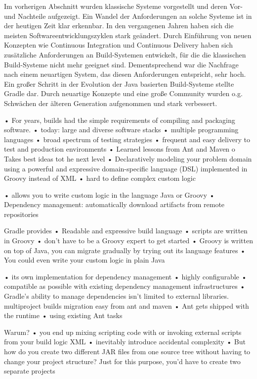 Im vorherigen Abschnitt wurden klassische Systeme vorgestellt und deren Vor- und Nachteile aufgezeigt.  Ein Wandel der Anforderungen an solche Systeme ist in der heutigen Zeit klar erkennbar.
In den vergangenen Jahren haben sich die meisten Softwareentwicklungszyklen stark geändert. Durch Einführung von neuen Konzepten wie Continuous Integration und Continuous Delivery haben sich zusätzliche Anforderungen an Build-Systemen entwickelt, für die die klassischen Build-Systeme nicht mehr geeignet sind. Dementsprechend war die Nachfrage nach einem neuartigen System, das diesen Anforderungen entspricht, sehr hoch. Ein großer Schritt in der Evolution der Java basierten Build-Systeme stellte Gradle dar. Durch neuartige Konzepte und eine große Community wurden o.g. Schwächen der älteren Generation aufgenommen und stark verbessert.



•	For years, builds had the simple requirements of compiling and packaging software.
•	today: large and diverse software stacks
•	multiple programming languages
•	broad spectrum of testing strategies
•	frequent and easy delivery to test and production environments
•	Learned lessons from Ant and Maven
	o	Takes best ideas tot he next level
•	Declaratively modeling your problem domain using a powerful and expressive domain-specific language (DSL) implemented in Groovy instead of XML
•	hard to define complex custom logic

•	allows you to write custom logic in the language Java or Groovy
•	Dependency management: automatically download artifacts from remote repositories

Gradle provides
•	Readable and expressive build language
•	scripts are written in Groovy
•	don’t have to be a Groovy expert to get started
•	Groovy is written on top of Java, you can migrate gradually by trying out its language features
•	You could even write your custom logic in plain Java

•	its own implementation for dependency management
•	highly configurable
•	compatible as possible with existing dependency management infrastructures
•	Gradle’s ability to manage dependencies isn’t limited to external libraries.
multiproject builds
migration easy from ant and maven
•	Ant gets shipped with the runtime 
•	using existing Ant tasks

Warum?
•	you end up mixing scripting code with or invoking external scripts from your build logic XML
•	inevitably introduce accidental complexity
•	But how do you create two different JAR files from one source tree without having to change your project structure? Just for this purpose, you’d have to create two separate projects

